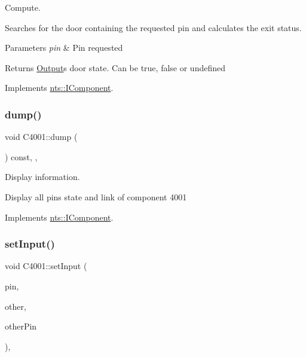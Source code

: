 Compute. 

Searches for the door containing the requested pin and calculates the exit status.


\begin{DoxyParams}{Parameters}
{\em pin} & Pin requested \\
\hline
\end{DoxyParams}
\begin{DoxyReturn}{Returns}
\mbox{\hyperlink{classOutput}{Output}}\textquotesingle{}s door state. Can be true, false or undefined 
\end{DoxyReturn}


Implements \mbox{\hyperlink{classnts_1_1IComponent}{nts\+::\+I\+Component}}.

\mbox{\label{classC4001_a2c2b7a726830f95515ce5538c1508b1f}} 
\subsubsection{\texorpdfstring{dump()}{dump()}}
{\footnotesize\ttfamily void C4001\+::dump (\begin{DoxyParamCaption}{ }\end{DoxyParamCaption}) const\hspace{0.3cm}{\ttfamily [override]}, {\ttfamily [virtual]}, {\ttfamily [noexcept]}}



Display information. 

Display all pins state and link of component 4001 

Implements \mbox{\hyperlink{classnts_1_1IComponent}{nts\+::\+I\+Component}}.

\mbox{\label{classC4001_a6cd7ce77dbd4bba7cbbdca0bc14cdb3b}} 
\subsubsection{\texorpdfstring{set\+Input()}{setInput()}}
{\footnotesize\ttfamily void C4001\+::set\+Input (\begin{DoxyParamCaption}\item[{std\+::size\+\_\+t}]{pin,  }\item[{\mbox{\hyperlink{classnts_1_1IComponent}{nts\+::\+I\+Component}} \&}]{other,  }\item[{std\+::size\+\_\+t}]{other\+Pin }\end{DoxyParamCaption})\hspace{0.3cm}{\ttfamily [final]}, {\ttfamily [virtual]}}



